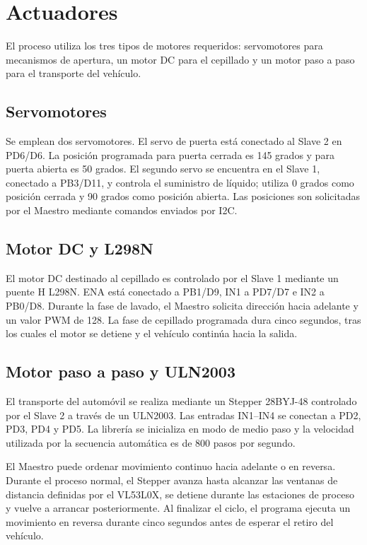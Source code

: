 \section{Actuadores}

El proceso utiliza los tres tipos de motores requeridos: servomotores para mecanismos de apertura, un motor DC para el cepillado y un motor paso a paso para el transporte del vehículo.

\subsection{Servomotores}
Se emplean dos servomotores. El servo de puerta está conectado al Slave 2 en PD6/D6. La posición programada para puerta cerrada es 145 grados y para puerta abierta es 50 grados. El segundo servo se encuentra en el Slave 1, conectado a PB3/D11, y controla el suministro de líquido; utiliza 0 grados como posición cerrada y 90 grados como posición abierta. Las posiciones son solicitadas por el Maestro mediante comandos enviados por I2C.

\subsection{Motor DC y L298N}
El motor DC destinado al cepillado es controlado por el Slave 1 mediante un puente H L298N. ENA está conectado a PB1/D9, IN1 a PD7/D7 e IN2 a PB0/D8. Durante la fase de lavado, el Maestro solicita dirección hacia adelante y un valor PWM de 128. La fase de cepillado programada dura cinco segundos, tras los cuales el motor se detiene y el vehículo continúa hacia la salida.

\subsection{Motor paso a paso y ULN2003}
El transporte del automóvil se realiza mediante un Stepper 28BYJ-48 controlado por el Slave 2 a través de un ULN2003. Las entradas IN1--IN4 se conectan a PD2, PD3, PD4 y PD5. La librería se inicializa en modo de medio paso y la velocidad utilizada por la secuencia automática es de 800 pasos por segundo.

El Maestro puede ordenar movimiento continuo hacia adelante o en reversa. Durante el proceso normal, el Stepper avanza hasta alcanzar las ventanas de distancia definidas por el VL53L0X, se detiene durante las estaciones de proceso y vuelve a arrancar posteriormente. Al finalizar el ciclo, el programa ejecuta un movimiento en reversa durante cinco segundos antes de esperar el retiro del vehículo.
